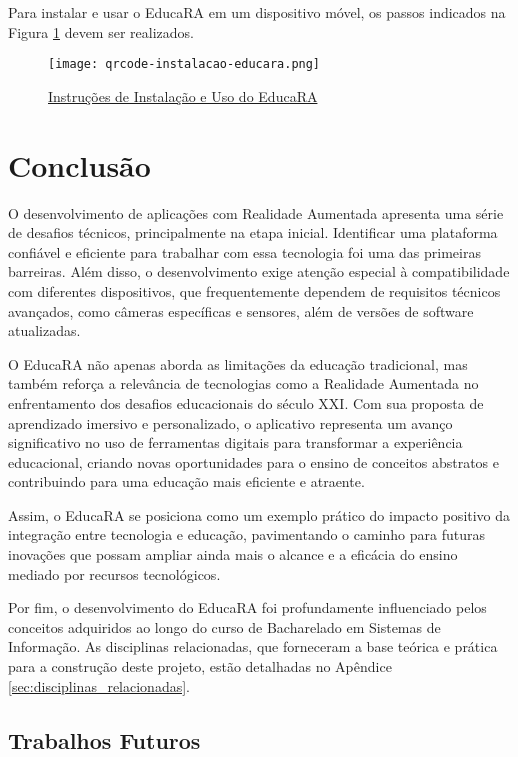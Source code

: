 \documentclass[12pt]{article}
\begin{document}
Para instalar e usar o EducaRA em um dispositivo móvel, os passos indicados na Figura \ref{fig:qrcode-uso} devem ser realizados.

\begin{figure}[!htb]
  \centering
  \texttt{[image: qrcode-instalacao-educara.png]}
  \caption{\href{https://drive.google.com/file/d/1II7FLlL0nzuAuikvs874JeZjUGYR2WhQ/view?usp=sharing}{Instruções de Instalação e Uso do EducaRA}}
  \label{fig:qrcode-uso}
\end{figure}

\section{Conclusão}\label{sec:conclusao}

O desenvolvimento de aplicações com Realidade Aumentada apresenta uma série de desafios técnicos, principalmente na etapa inicial. Identificar uma plataforma confiável e eficiente para trabalhar com essa tecnologia foi uma das primeiras barreiras. Além disso, o desenvolvimento exige atenção especial à compatibilidade com diferentes dispositivos, que frequentemente dependem de requisitos técnicos avançados, como câmeras específicas e sensores, além de versões de software atualizadas.

O EducaRA não apenas aborda as limitações da educação tradicional, mas também reforça a relevância de tecnologias como a Realidade Aumentada no enfrentamento dos desafios educacionais do século XXI. Com sua proposta de aprendizado imersivo e personalizado, o aplicativo representa um avanço significativo no uso de ferramentas digitais para transformar a experiência educacional, criando novas oportunidades para o ensino de conceitos abstratos e contribuindo para uma educação mais eficiente e atraente.

Assim, o EducaRA se posiciona como um exemplo prático do impacto positivo da integração entre tecnologia e educação, pavimentando o caminho para futuras inovações que possam ampliar ainda mais o alcance e a eficácia do ensino mediado por recursos tecnológicos.

Por fim, o desenvolvimento do EducaRA foi profundamente influenciado pelos conceitos adquiridos ao longo do curso de Bacharelado em Sistemas de Informação. As disciplinas relacionadas, que forneceram a base teórica e prática para a construção deste projeto, estão detalhadas no Apêndice \ref{sec:disciplinas_relacionadas}.


\subsection{Trabalhos Futuros}
\end{document}
